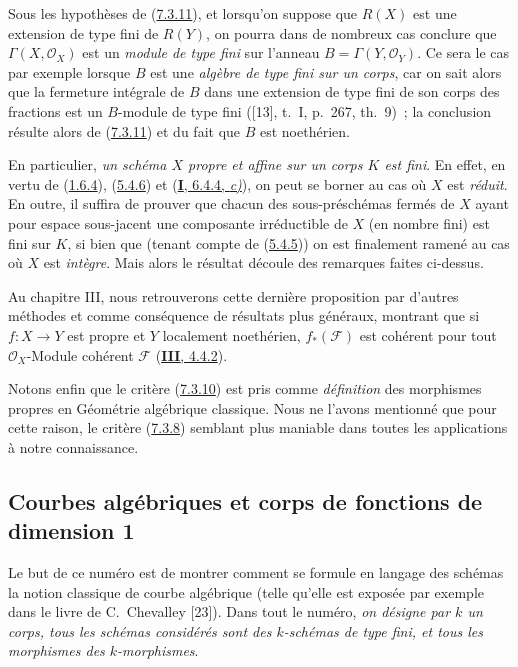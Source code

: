 \begin{remark}[7.3.12]
\label{II.7.3.12-fr}
Sous les hypothèses de (\hyperref[II.7.3.11-fr]{7.3.11}), et lorsqu'on suppose
que $R(X)$ est une extension de type fini de $R(Y)$, on pourra dans de nombreux
cas conclure que $\Gamma(X,\mathcal{O}_X)$ est un \emph{module de type fini}
sur l'anneau $B=\Gamma(Y,\mathcal{O}_Y)$. Ce sera le cas par exemple lorsque
$B$ est une \emph{algèbre de type fini sur un corps}, car on sait alors que la
fermeture intégrale de $B$ dans une extension de type fini de son corps des
fractions est un $B$-module de type fini ([13], t.~I, p.~267, th.~9)~; la
conclusion résulte alors de (\hyperref[II.7.3.11-fr]{7.3.11}) et du fait que
$B$ est noethérien.

En particulier, \emph{un schéma $X$ propre et affine sur un corps $K$ est
fini}. En effet, en vertu de (\hyperref[II.1.6.4-fr]{1.6.4}),
(\hyperref[II.5.4.6-fr]{5.4.6}) et
(\hyperref[I.6.4.4-fr]{\textbf{I}, 6.4.4, \emph{c)}}), on peut se borner au cas où $X$ est
\emph{réduit}. En outre, il suffira de prouver que chacun des sous-préschémas
fermés de $X$ ayant pour espace sous-jacent une composante irréductible de $X$
(en nombre fini) est fini sur $K$, si bien que (tenant compte de
(\hyperref[II.5.4.5-fr]{5.4.5})) on est finalement ramené au cas où $X$ est
\emph{intègre}. Mais alors le résultat découle des remarques faites ci-dessus.

Au chapitre III, nous retrouverons cette dernière proposition par d'autres
méthodes et comme conséquence de résultats plus généraux, montrant que si
$f:X\to Y$ est propre et $Y$ localement noethérien, $f_*(\mathcal{F})$ est
cohérent pour tout $\mathcal{O}_X$-Module cohérent $\mathcal{F}$
(\hyperref[III.4.4.2-fr]{\textbf{III}, 4.4.2}).

Notons enfin que le critère (\hyperref[II.7.3.10-fr]{7.3.10}) est pris comme
\emph{définition} des morphismes propres en Géométrie algébrique classique.
Nous ne l'avons mentionné que pour cette raison, le critère
(\hyperref[II.7.3.8-fr]{7.3.8}) semblant plus maniable dans toutes les
applications à notre connaissance.
\end{remark}

\subsection{Courbes algébriques et corps de fonctions de dimension 1}
\label{subsection:II.7.4-fr}

Le but de ce numéro est de montrer comment se formule en langage des schémas
la notion classique de courbe algébrique (telle qu'elle est exposée par
exemple dans le livre de C.~Chevalley [23]). Dans tout le numéro, \emph{on
désigne par $k$ un corps, tous les schémas considérés sont des $k$-schémas de
type fini, et tous les morphismes des $k$-morphismes}.

